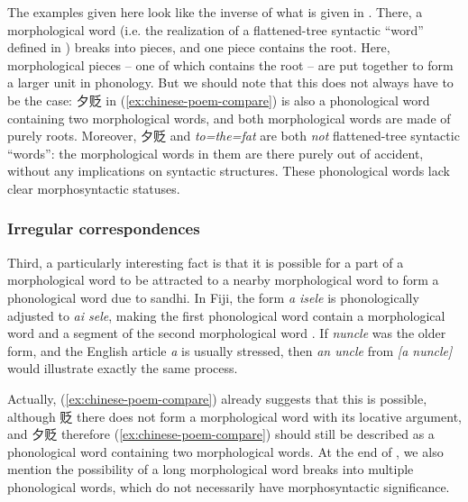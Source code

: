 \documentclass[a4paper, oneside, scheme=plain, 12pt]{article}
\newcommand*{\citepage}[1]{p.~{#1}}
\newcommand{\form}[1]{\emph{#1}}
\begin{document}
The examples given here look like the inverse of what is given in .
There, a morphological word (i.e. the realization of a flattened-tree syntactic ``word'' defined in ) breaks into pieces,
and one piece contains the root.
Here, morphological pieces -- one of which contains the root -- are put together to form a larger unit in phonology.
But we should note that this does not always have to be the case:
夕贬 in (\ref{ex:chinese-poem-compare}) is also a phonological word containing two morphological words,
and both morphological words are made of purely roots.
Moreover, 夕贬 and \form{to=the=fat} are both \emph{not} flattened-tree syntactic ``words'':
the morphological words in them are there purely out of accident,
without any implications on syntactic structures.
These phonological words lack clear morphosyntactic statuses.

\subsubsection{Irregular correspondences}\label{sec:irregular-phonological-morphology-correspondence}

Third, a particularly interesting fact is that it is possible for a part of a morphological word
to be attracted to a nearby morphological word to form a phonological word due to sandhi.
In Fiji, the form \form{a isele} is phonologically adjusted to \form{ai sele},
making the first phonological word contain a morphological word and a segment of the second morphological word
\citep[\citepage{25}]{dixon2010basic2}.
If \form{nuncle} was the older form, and the English article \form{a} is usually stressed, then \form{an uncle} from \form{[a nuncle]} would illustrate exactly the same process.

Actually, (\ref{ex:chinese-poem-compare}) already suggests that this is possible,
although 贬 there does not form a morphological word with its locative argument,
and 夕贬 therefore (\ref{ex:chinese-poem-compare}) should still be described as
a phonological word containing two morphological words.
At the end of ,
we also mention the possibility of a long morphological word breaks into multiple phonological words,
which do not necessarily have morphosyntactic significance.
\end{document}
